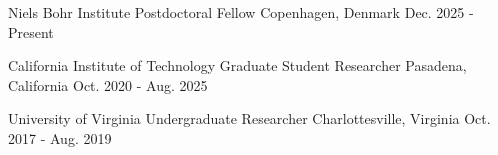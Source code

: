 

\begin{cventries}

\cventry
    {Niels Bohr Institute} %
    {Postdoctoral Fellow} %
    {Copenhagen, Denmark} %
    {Dec. 2025 - Present} %
    { }

  \cventry
    {California Institute of Technology} %
    {Graduate Student Researcher} %
    {Pasadena, California} %
    {Oct. 2020 - Aug. 2025} %
    {
    }

  \cventry
    {University of Virginia} %
    {Undergraduate Researcher} %
    {Charlottesville, Virginia} %
    {Oct. 2017 - Aug. 2019} %
    {
    }


\end{cventries}
